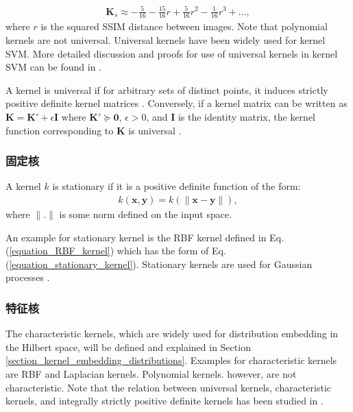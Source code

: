 \documentclass[lang=cn,10pt]{gorgeousnbook}
\numberwithin{equation}{section}%
\numberwithin{figure}{section}%
\begin{document}
\begin{align*}
\boldsymbol{K}_s \approx -\frac{5}{16} - \frac{15}{16} r + \frac{5}{16} r^2 - \frac{1}{16} r^3 + \dots,
\end{align*}
where $r$ is the squared SSIM distance \cite{brunet2011mathematical} between images. 
Note that polynomial kernels are not universal. %
Universal kernels have been widely used for kernel SVM. 
More detailed discussion and proofs for use of universal kernels in kernel SVM can be found in \cite{steinwart2008support}.


\begin{lemma}
A kernel is universal if for arbitrary sets of distinct points, it induces strictly positive definite kernel matrices \cite{borgwardt2006integrating,song2008learning}. Conversely, if a kernel matrix can be written as $\boldsymbol{K} = \boldsymbol{K}' + \epsilon \boldsymbol{I}$ where $\boldsymbol{K}' \succeq \boldsymbol{0}$, $\epsilon > 0$, and $\boldsymbol{I}$ is the identity matrix, the kernel function corresponding to $\boldsymbol{K}$ is universal \cite{pan2008transfer}.
\end{lemma}



\subsubsection{固定核}

\begin{definition}
A kernel $k$ is stationary if it is a positive definite function of the form:
\begin{align}\label{equation_stationary_kernel}
k(\boldsymbol{x}, \boldsymbol{y}) = k(\|\boldsymbol{x} - \boldsymbol{y}\|),
\end{align}
where $\|.\|$ is some norm defined on the input space. 
\end{definition}
An example for stationary kernel is the RBF kernel defined in Eq. (\ref{equation_RBF_kernel}) which has the form of Eq. (\ref{equation_stationary_kernel}). 
Stationary kernels are used for Gaussian processes \cite{noack2021advanced}. 

\subsubsection{特征核}

The characteristic kernels, which are widely used for distribution embedding in the Hilbert space, will be defined and explained in Section \ref{section_kernel_embedding_distributions}.
Examples for characteristic kernels are RBF and Laplacian kernels. Polynomial kernels. however, are not characteristic.
Note that the relation between universal kernels, characteristic kernels, and integrally strictly positive definite kernels has been studied in \cite{sriperumbudur2011universality}.
\end{document}
